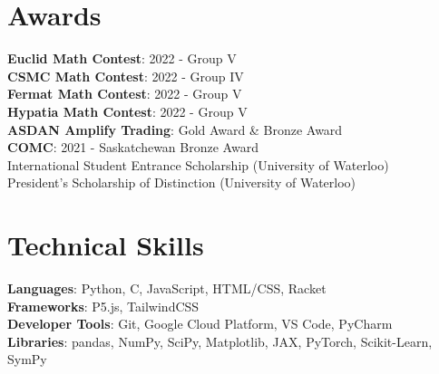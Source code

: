 \documentclass[letterpaper,11pt]{article}
\begin{document}
\section{Awards}
\begin{itemize}[leftmargin=0.15in, label={}]
    \small{\item{
    \textbf{Euclid Math Contest}{: 2022 - Group V} \\
    \textbf{CSMC Math Contest}{: 2022 - Group IV} \\
    \textbf{Fermat Math Contest}{: 2022 - Group V} \\
    \textbf{Hypatia Math Contest}{: 2022 - Group V} \\
    \textbf{ASDAN Amplify Trading}{: Gold Award \& Bronze Award} \\
    \textbf{COMC}{: 2021 - Saskatchewan Bronze Award} \\
    {International Student Entrance Scholarship (University of Waterloo)} \\
    {President’s Scholarship of Distinction (University of Waterloo)}
    }}
\end{itemize}



%
\section{Technical Skills}
\begin{itemize}[leftmargin=0.15in, label={}]
    \small{\item{
    \textbf{Languages}{: Python, C, JavaScript, HTML/CSS, Racket} \\
    \textbf{Frameworks}{: P5.js, TailwindCSS} \\
    \textbf{Developer Tools}{: Git, Google Cloud Platform, VS Code, PyCharm} \\
    \textbf{Libraries}{: pandas, NumPy, SciPy, Matplotlib, JAX, PyTorch, Scikit-Learn, SymPy}
    }}
\end{itemize}



\end{document}
